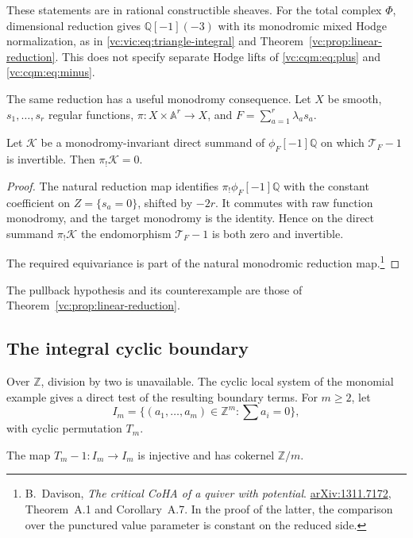These statements are in rational constructible sheaves.
For the total complex $\Phi$, dimensional reduction gives
$\mathbb Q[-1](-3)$ with its monodromic mixed Hodge
normalization, as in \eqref{vc:vic:eq:triangle-integral} and
Theorem~\ref{vc:prop:linear-reduction}.
This does not specify separate Hodge lifts of
\eqref{vc:cqm:eq:plus} and \eqref{vc:cqm:eq:minus}.

The same reduction has a useful monodromy consequence.
Let $X$ be smooth, $s_1,\ldots,s_r$ regular functions,
$\pi:X\times\mathbb A^r\to X$, and
$F=\sum_{a=1}^r\lambda_a s_a$.

\begin{proposition}\label{vc:cqm:prop:linear-monodromy}
Let $\mathcal K$ be a monodromy-invariant direct
summand of $\phi_F[-1]\mathbb Q$ on which
$\mathcal T_F-1$ is invertible. Then $\pi_!\mathcal K=0$.
\end{proposition}

\begin{proof}
The natural reduction map identifies
$\pi_!\phi_F[-1]\mathbb Q$ with the constant
coefficient on $Z=\{s_a=0\}$, shifted by $-2r$.
It commutes with raw function monodromy, and the
target monodromy is the identity. Hence on the
direct summand $\pi_!\mathcal K$ the endomorphism
$\mathcal T_F-1$ is both zero and invertible.

The required equivariance is part of the natural
monodromic reduction map.\footnote{B.~Davison,
\emph{The critical CoHA of a quiver with potential}.
\href{https://arxiv.org/abs/1311.7172}{arXiv:1311.7172},
Theorem~A.1 and Corollary~A.7. In the proof of the latter,
the comparison over the punctured value parameter is
constant on the reduced side.}
\end{proof}

The pullback hypothesis and its counterexample are those
of Theorem~\ref{vc:prop:linear-reduction}.

\subsection{The integral cyclic boundary}

Over $\mathbb Z$, division by two is unavailable.
The cyclic local system of the monomial example gives
a direct test of the resulting boundary terms.
For $m\ge2$, let
\[
 I_m=\{(a_1,\ldots,a_m)\in\mathbb Z^m:
                         \textstyle\sum a_i=0\},
\]
with cyclic permutation $T_m$.

\begin{proposition}\label{vc:cqm:prop:integral-link}
The map $T_m-1:I_m\to I_m$ is injective and has
cokernel $\mathbb Z/m$.
\end{proposition}


